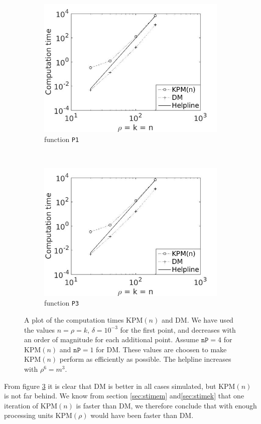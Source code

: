 \begin{figure}[H]
        \centering
        \begin{subfigure}[b]{0.45\textwidth}
                \includegraphics[width=\textwidth]{fig/comp2}
                \caption{function \texttt{P1}}
                \label{fig:c1comp1m}
        \end{subfigure}%
        ~
        \begin{subfigure}[b]{0.45\textwidth}
                \includegraphics[width=\textwidth]{fig/comp2}
                \caption{function \texttt{P3}}
                \label{fig:c2comp2m}
        \end{subfigure}
        \caption{A plot of the computation times KPM$(n)$ and DM. We have used the values $n = \rho = k$, $\delta = 10^{-3}$ for the first point, and decreases with an order of magnitude for each additional point. Assume $\texttt{nP} = 4$ for KPM$(n)$ and $\texttt{nP} = 1$ for DM. These values are choosen to make KPM$(n)$ perform as efficiently as possible. The helpline increases with $\rho^6 = m^3$.}\label{fig:comp}
\end{figure}
From figure \ref{fig:comp} it is clear that DM is better in all cases simulated, but KPM$(n)$ is not far behind. We know from section \ref{sec:stimem} and\ref{sec:stimek} that one iteration of KPM$(n)$ is faster than DM, we therefore conclude that with enough processing units KPM$(\rho)$ would have been faster than DM. \\

